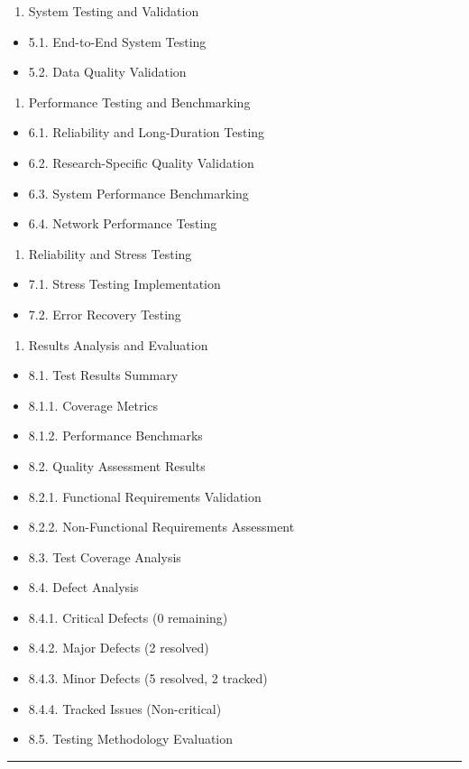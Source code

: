 \documentclass[11pt,a4paper]{report}
\begin{document}
\begin{enumerate}
\item System Testing and Validation
\end{enumerate}
\begin{itemize}
\item 5.1. End-to-End System Testing
\item 5.2. Data Quality Validation
\end{itemize}
\begin{enumerate}
\item Performance Testing and Benchmarking
\end{enumerate}
\begin{itemize}
\item 6.1. Reliability and Long-Duration Testing
\item 6.2. Research-Specific Quality Validation
\item 6.3. System Performance Benchmarking
\item 6.4. Network Performance Testing
\end{itemize}
\begin{enumerate}
\item Reliability and Stress Testing
\end{enumerate}
\begin{itemize}
\item 7.1. Stress Testing Implementation
\item 7.2. Error Recovery Testing
\end{itemize}
\begin{enumerate}
\item Results Analysis and Evaluation
\end{enumerate}
\begin{itemize}
\item 8.1. Test Results Summary
\item 8.1.1. Coverage Metrics
\item 8.1.2. Performance Benchmarks
\item 8.2. Quality Assessment Results
\item 8.2.1. Functional Requirements Validation
\item 8.2.2. Non-Functional Requirements Assessment
\item 8.3. Test Coverage Analysis
\item 8.4. Defect Analysis
\item 8.4.1. Critical Defects (0 remaining)
\item 8.4.2. Major Defects (2 resolved)
\item 8.4.3. Minor Defects (5 resolved, 2 tracked)
\item 8.4.4. Tracked Issues (Non-critical)
\item 8.5. Testing Methodology Evaluation

\end{itemize}
\hrule
\end{document}
